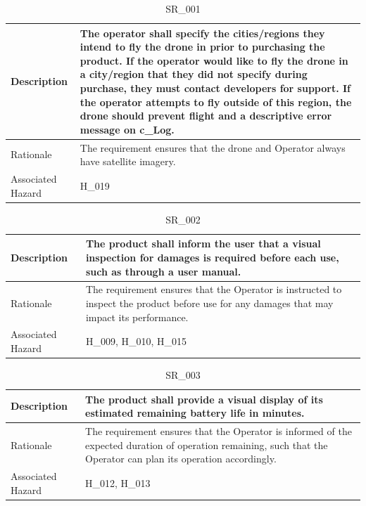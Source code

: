 \documentclass{article}
\begin{document}
\begin{table}[!h]
\begin{center}
\caption {SR\_001} 
\label{SR_001}
\begin{tabular}{ | m{3cm} | m{11cm} | }
\hline
Description & The operator shall specify the cities/regions they intend to fly the drone in prior to purchasing the product. If the operator would like to fly the drone in a  city/region that they did not specify during purchase, they must contact developers for support. If the operator attempts to fly outside of this region, the drone should prevent flight and a descriptive error message on c\_Log.
 \\
\hline
Rationale & The requirement ensures that the drone and Operator always have satellite imagery. \\
\hline
Associated Hazard & H\_019 \\
\hline
\end{tabular}
\end{center}
\end{table}

\begin{table}[!h]
\begin{center}
\caption {SR\_002} 
\label{SR_002}
\begin{tabular}{ | m{3cm} | m{11cm} | }
\hline
Description & The product shall inform the user that a visual inspection for damages is required before each use, such as through a user manual.
 \\
\hline
Rationale & The requirement ensures that the Operator is instructed to inspect the product before use for any damages that may impact its performance. \\
\hline
Associated Hazard & H\_009, H\_010, H\_015 \\
\hline
\end{tabular}
\end{center}
\end{table}

\begin{table}[!h]
\begin{center}
\caption {SR\_003} 
\label{SR_003}
\begin{tabular}{ | m{3cm} | m{11cm} | }
\hline
Description & The product shall provide a visual display of its estimated remaining battery life in minutes.
 \\
\hline
Rationale & The requirement ensures that the Operator is informed of the expected duration of operation remaining, such that the Operator can plan its operation accordingly. \\
\hline
Associated Hazard & H\_012, H\_013 \\
\hline
\end{tabular}
\end{center}
\end{table}
\end{document}
